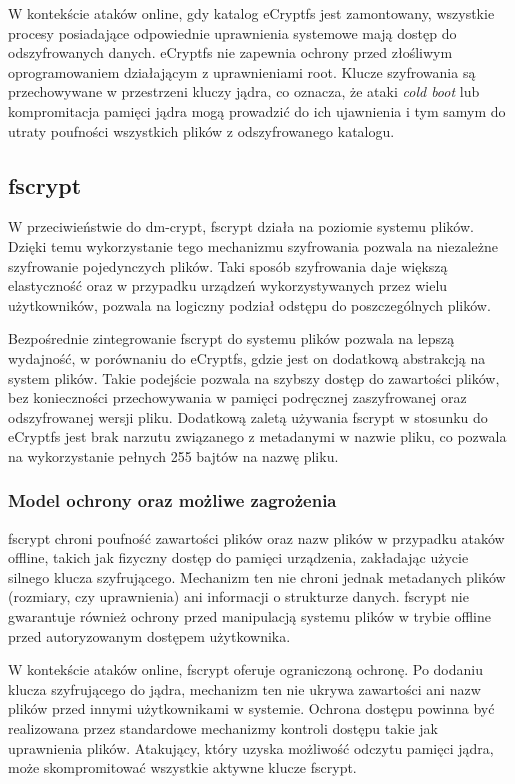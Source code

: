 \documentclass[a4paper]{article}
\begin{document}
W kontekście ataków online, gdy katalog eCryptfs jest zamontowany, wszystkie procesy
posiadające odpowiednie uprawnienia systemowe mają dostęp do odszyfrowanych danych.
eCryptfs nie zapewnia ochrony przed złośliwym oprogramowaniem działającym z uprawnieniami
root. Klucze szyfrowania są przechowywane w przestrzeni kluczy jądra,  co oznacza, że ataki
\textit{cold boot} lub kompromitacja pamięci jądra mogą prowadzić do ich ujawnienia i tym samym
do utraty poufności wszystkich plików z odszyfrowanego katalogu.


\subsection{fscrypt}
W przeciwieństwie do dm-crypt, fscrypt działa na poziomie systemu plików. Dzięki temu
wykorzystanie tego mechanizmu szyfrowania pozwala na niezależne szyfrowanie pojedynczych
plików. Taki sposób szyfrowania daje większą elastyczność oraz w przypadku urządzeń
wykorzystywanych przez wielu użytkowników, pozwala na logiczny podział odstępu do
poszczególnych plików.

Bezpośrednie zintegrowanie fscrypt do systemu plików pozwala na lepszą wydajność,
w porównaniu do eCryptfs, gdzie jest on dodatkową abstrakcją na system plików. Takie
podejście pozwala na szybszy dostęp do zawartości plików, bez konieczności przechowywania
w pamięci podręcznej zaszyfrowanej oraz odszyfrowanej wersji pliku. Dodatkową zaletą
używania fscrypt w stosunku do eCryptfs jest brak narzutu związanego z metadanymi w nazwie
pliku, co pozwala na wykorzystanie pełnych 255 bajtów na nazwę pliku.

\subsubsection{Model ochrony oraz możliwe zagrożenia}
fscrypt chroni poufność zawartości plików oraz nazw plików w przypadku ataków offline,
takich jak fizyczny dostęp do pamięci urządzenia, zakładając użycie silnego klucza
szyfrującego. Mechanizm ten nie chroni jednak metadanych plików (rozmiary, czy uprawnienia) ani
informacji o strukturze danych. fscrypt nie gwarantuje również ochrony przed manipulacją systemu
plików w trybie offline przed autoryzowanym dostępem użytkownika.

W kontekście ataków online, fscrypt oferuje ograniczoną ochronę. Po dodaniu klucza
szyfrującego do jądra, mechanizm ten nie ukrywa zawartości ani nazw plików przed innymi
użytkownikami w systemie. Ochrona dostępu powinna być realizowana przez standardowe
mechanizmy kontroli dostępu takie jak uprawnienia plików. Atakujący, który uzyska
możliwość odczytu pamięci jądra, może skompromitować wszystkie aktywne klucze fscrypt.
\end{document}
